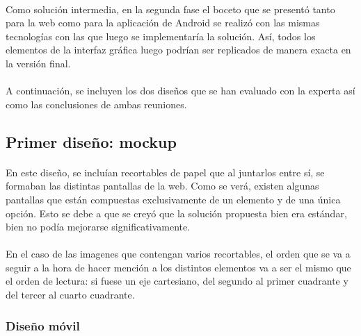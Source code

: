 \paragraph{}
Como solución intermedia, en la segunda fase el boceto que se presentó tanto para la web como para la aplicación de Android se realizó con las mismas tecnologías con las que luego se implementaría la solución. Así, todos los elementos de la interfaz gráfica luego podrían ser replicados de manera exacta en la versión final.

\paragraph{}
A continuación, se incluyen los dos diseños que se han evaluado con la experta así como las conclusiones de ambas reuniones.

\subsection{Primer diseño: mockup}
\paragraph{}
En este diseño, se incluían recortables de papel que al juntarlos entre sí, se formaban las distintas pantallas de la web. Como se verá, existen algunas pantallas que están compuestas exclusivamente de un elemento y de una única opción. Esto se debe a que se creyó que la solución propuesta bien era estándar, bien no podía mejorarse significativamente.

\paragraph{}
En el caso de las imagenes que contengan varios recortables, el orden que se va a seguir a la hora de hacer mención a los distintos elementos va a ser el mismo que el orden de lectura: si fuese un eje cartesiano, del segundo al primer cuadrante y del tercer al cuarto cuadrante.

\subsubsection{Diseño móvil}

